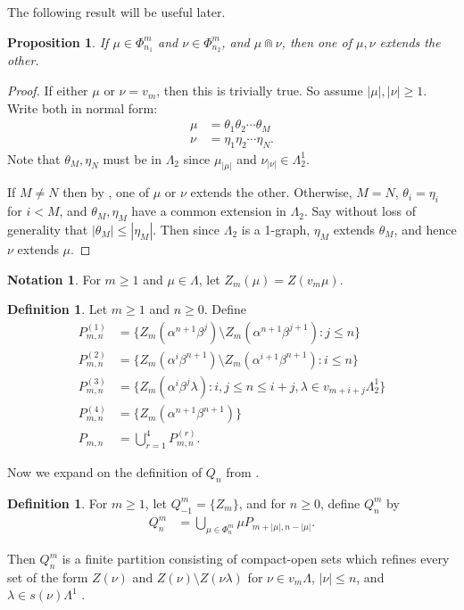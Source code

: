 \documentclass[12pt]{amsart}
\newcommand{\sm}{\setminus}
\newcommand{\al}{\alpha}
\newcommand{\be}{\beta}
\renewcommand{\th}{\theta}
\newcommand{\la}{\lambda}
\newcommand{\La}{\Lambda}
\theoremstyle{plain} %
\newtheorem{Proposition}[Theorem]{Proposition}
\theoremstyle{definition} %
\newtheorem{Definition}[Theorem]{Definition}
\newtheorem*{Notation*}{Notation}
\begin{document}
The following result will be useful later.

\begin{Proposition}\label{prop extension}
    If $\mu \in \Phi_{n_1}^m$ and $\nu \in \Phi_{n_2}^m$, and $\mu \Cap \nu$, then one of $\mu, \nu$ extends the other.
\end{Proposition}
\begin{proof}
    If either $\mu$ or $\nu = v_m$, then this is trivially true. So assume $|\mu|, |\nu| \geq 1$. Write both in normal form:
    \begin{align*}
        \mu &= \th_1 \th_2 \cdots \th_M\\
        \nu &= \eta_1 \eta_2 \cdots \eta_N.
    \end{align*}
    Note that $\th_M, \eta_N$ must be in $\La_2$ since $\mu_{|\mu|}$ and $\nu_{|\nu|} \in \La_2^1.$

    If $M \neq N$ then by \cite[Lemma 3.4]{MS22}, one of $\mu$ or $\nu$ extends the other. Otherwise, $M = N$, $\th_i = \eta_i$ for $i < M$, and $\th_M, \eta_M$ have a common extension in $\La_2$. Say without loss of generality that $|\th_M| \leq |\eta_M|$. Then since $\La_2$ is a 1-graph, $\eta_M$ extends $\th_M$, and hence $\nu$ extends $\mu$.
\end{proof}

\begin{Notation*}
For $m \ge 1$ and $\mu \in \La$, let $Z_m(\mu) = Z(v_m \mu)$.    
\end{Notation*}

\begin{Definition}\label{def Pmn}\cite[Lemma 5.3]{MS22}  Let $m \ge 1$ and $n \ge 0$. Define
\begin{align*}
    P^{(1)}_{m,n} &= \{Z_m(\al^{n+1}\be^j)\sm Z_m(\al^{n+1}\be^{j+1}) : j \leq n\}\\
    P^{(2)}_{m,n} &= \{Z_m(\al^{i}\be^{n+1})\sm Z_m(\al^{i+1}\be^{n+1}) : i \leq n\}\\
    P^{(3)}_{m,n} &= \{Z_m(\al^{i}\be^j \la) : i, j \leq n \leq i+j, \la \in v_{m+i+j}\La_2^1\}\\
    P^{(4)}_{m,n} &= \{Z_m(\al^{n+1}\be^{n+1})\}\\
    P_{m,n} &= \bigcup_{r=1}^4 P_{m,n}^{(r)}.
\end{align*}
\end{Definition}

Now we expand on the definition of $Q_n$ from \cite[Proposition 5.6]{MS22}. 

\begin{Definition}\label{def Qmn}
For $m \ge 1$, let $Q^m_{-1} = \{Z_m\}$, and for $n \ge 0$, define $Q_n^m$ by
\begin{align*}
    Q^m_n &= \bigcup_{\mu\in \Phi^m_n} \mu P_{m+|\mu|, n-|\mu|}.
\end{align*}
\end{Definition}
Then $Q^m_n$ is a finite partition consisting of compact-open sets which refines every set of the form $Z(\nu)$ and $Z(\nu) \sm Z(\nu \lambda)$ for $\nu \in v_m\Lambda$, $|\nu| \leq n$, and $\lambda \in s(\nu)\Lambda^1$ \cite[Proposition 5.6]{MS22}.
 
\end{document}

